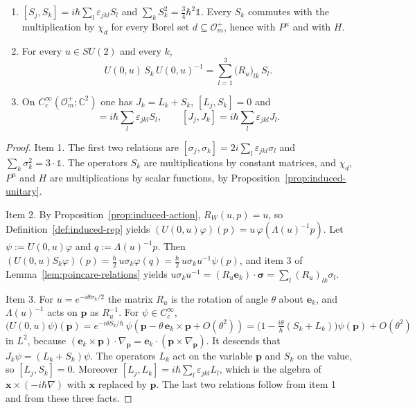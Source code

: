 \begin{proposition}\label{prop:spin-rotations}
	\begin{enumerate}
		\item $[S_j,S_k]=i\hbar\sum_l\varepsilon_{jkl}S_l$ and $\sum_kS_k^2=\frac34\hbar^2\mathbb{1}$. Every $S_k$ commutes with the multiplication by $\chi_d$ for every Borel set $d\subseteq\mathcal{O}_m^+$, hence with $P^\mu$ and with $H$.
		\item For every $u\in SU(2)$ and every $k$,
		\begin{equation}\label{eq:spin-rotation}
			U(0,u)\,S_k\,U(0,u)^{-1}=\sum_{l=1}^3\big(R_u\big)_{lk}\,S_l.
		\end{equation}
		\item On $C_c^\infty(\mathcal{O}_m^+;\mathbb{C}^2)$ one has $J_k=L_k+S_k$, $[L_j,S_k]=0$ and
		\begin{equation*}
			[J_j,S_k]=i\hbar\sum_l\varepsilon_{jkl}S_l,\qquad [J_j,J_k]=i\hbar\sum_l\varepsilon_{jkl}J_l.
		\end{equation*}
	\end{enumerate}
\end{proposition}

\begin{proof}
	Item 1. The first two relations are $[\sigma_j,\sigma_k]=2i\sum_l\varepsilon_{jkl}\sigma_l$ and $\sum_k\sigma_k^2=3\cdot\mathbb{1}$. The operators $S_k$ are multiplications by constant matrices, and $\chi_d$, $P^\mu$ and $H$ are multiplications by scalar functions, by Proposition~\ref{prop:induced-unitary}.
	
	Item 2. By Proposition~\ref{prop:induced-action}, $R_W(u,p)=u$, so Definition~\ref{def:induced-rep} yields $(U(0,u)\varphi)(p)=u\,\varphi(\Lambda(u)^{-1}p)$. Let $\psi:=U(0,u)\varphi$ and $q:=\Lambda(u)^{-1}p$. Then $(U(0,u)S_k\varphi)(p)=\frac\hbar2\,u\sigma_k\varphi(q)=\frac\hbar2\,u\sigma_ku^{-1}\psi(p)$, and item 3 of Lemma~\ref{lem:poincare-relations} yields $u\sigma_ku^{-1}=(R_u\mathbf{e}_k)\cdot\boldsymbol{\sigma}=\sum_l(R_u)_{lk}\sigma_l$.
	
	Item 3. For $u=e^{-i\theta\sigma_k/2}$ the matrix $R_u$ is the rotation of angle $\theta$ about $\mathbf{e}_k$, and $\Lambda(u)^{-1}$ acts on $\mathbf{p}$ as $R_u^{-1}$. For $\psi\in C_c^\infty$,
	\begin{equation*}
		\big(U(0,u)\psi\big)(\mathbf{p})=e^{-i\theta S_k/\hbar}\,\psi(\mathbf{p}-\theta\,\mathbf{e}_k\times\mathbf{p}+O(\theta^2))=\big(1-\tfrac{i\theta}{\hbar}(S_k+L_k)\big)\psi(\mathbf{p})+O(\theta^2)
	\end{equation*}
	in $L^2$, because $(\mathbf{e}_k\times\mathbf{p})\cdot\nabla_{\mathbf{p}}=\mathbf{e}_k\cdot(\mathbf{p}\times\nabla_{\mathbf{p}})$. It descends that $J_k\psi=(L_k+S_k)\psi$. The operators $L_k$ act on the variable $\mathbf{p}$ and $S_k$ on the value, so $[L_j,S_k]=0$. Moreover $[L_j,L_k]=i\hbar\sum_l\varepsilon_{jkl}L_l$, which is the algebra of $\mathbf{x}\times(-i\hbar\nabla)$ with $\mathbf{x}$ replaced by $\mathbf{p}$. The last two relations follow from item 1 and from these three facts.
\end{proof}


